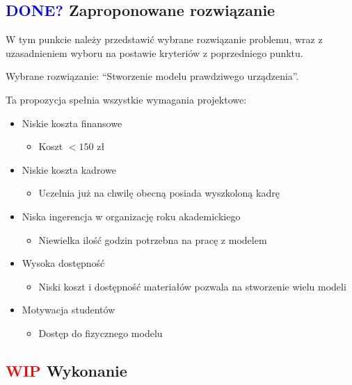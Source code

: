 \documentclass[11pt,titlepage,a4paper]{article}
\begin{document}
\subsection{\textcolor{blue}{DONE?} Zaproponowane rozwiązanie}

W tym punkcie należy przedstawić wybrane rozwiązanie problemu, wraz z uzasadnieniem wyboru na postawie kryteriów z poprzedniego punktu.

Wybrane rozwiązanie: \enquote{Stworzenie modelu prawdziwego urządzenia}.

Ta propozycja spełnia wszystkie wymagania projektowe:
\begin{itemize}
    \item Niskie koszta finansowe
          \begin{itemize}
              \item Koszt $<150$ zł
          \end{itemize}
    \item Niskie koszta kadrowe
          \begin{itemize}
              \item Uczelnia już na chwilę obecną posiada wyszkoloną kadrę
          \end{itemize}
    \item Niska ingerencja w organizację roku akademickiego
          \begin{itemize}
              \item Niewielka ilość godzin potrzebna na pracę z modelem
          \end{itemize}
    \item Wysoka dostępność
          \begin{itemize}
              \item Niski koszt i dostępność materiałów pozwala na stworzenie wielu modeli
          \end{itemize}
    \item Motywacja studentów
          \begin{itemize}
              \item Dostęp do fizycznego modelu
          \end{itemize}
\end{itemize}

\newpage

\subsection{\textcolor{red}{WIP} Wykonanie}
\end{document}
